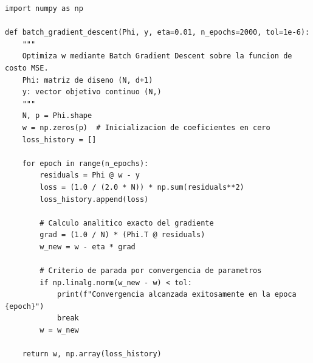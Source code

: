 \documentclass[11pt,a4paper]{article}
\begin{document}
\begin{lstlisting}[caption={Esqueleto orientativo de Descenso por el Gradiente por lotes vectorizado en NumPy.}, label={lst:gd}]
import numpy as np

def batch_gradient_descent(Phi, y, eta=0.01, n_epochs=2000, tol=1e-6):
    """
    Optimiza w mediante Batch Gradient Descent sobre la funcion de costo MSE.
    Phi: matriz de diseno (N, d+1)
    y: vector objetivo continuo (N,)
    """
    N, p = Phi.shape
    w = np.zeros(p)  # Inicializacion de coeficientes en cero
    loss_history = []
    
    for epoch in range(n_epochs):
        residuals = Phi @ w - y
        loss = (1.0 / (2.0 * N)) * np.sum(residuals**2)
        loss_history.append(loss)
        
        # Calculo analitico exacto del gradiente
        grad = (1.0 / N) * (Phi.T @ residuals)
        w_new = w - eta * grad
        
        # Criterio de parada por convergencia de parametros
        if np.linalg.norm(w_new - w) < tol:
            print(f"Convergencia alcanzada exitosamente en la epoca {epoch}")
            break
        w = w_new
        
    return w, np.array(loss_history)
\end{lstlisting}
\end{document}
